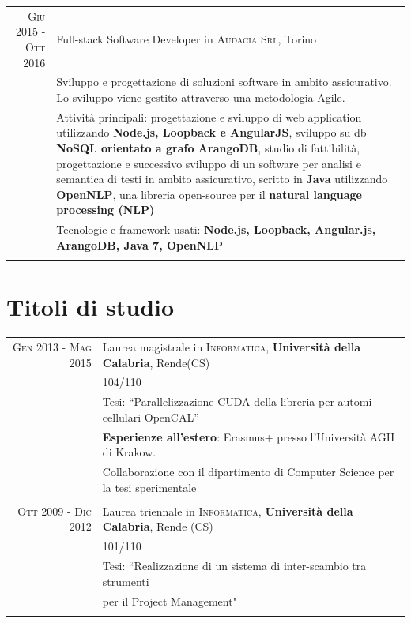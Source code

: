 \documentclass[a4paper,10pt]{article} %
\begin{document}
\begin{tabular}{r|p{11cm}}

\textsc{Giu 2015 - Ott 2016} & Full-stack Software Developer in \textsc{Audacia Srl}, Torino \emph{}\\
& \footnotesize{Sviluppo e progettazione di soluzioni software in ambito assicurativo. Lo sviluppo viene gestito attraverso una metodologia Agile. }\\
& \footnotesize{Attività principali: progettazione e sviluppo di web application utilizzando \textbf{Node.js, Loopback e AngularJS}, sviluppo su db \textbf{NoSQL orientato a grafo ArangoDB}, studio di fattibilità, progettazione e successivo sviluppo di un software per analisi e semantica di testi in ambito assicurativo, scritto in \textbf{Java} utilizzando \textbf{OpenNLP}, una libreria open-source per il \textbf{natural language processing (NLP)}}\\
& \footnotesize{Tecnologie e framework usati: \textbf{Node.js, Loopback, Angular.js, ArangoDB, Java 7, OpenNLP} }\\
\multicolumn{2}{c}{} \\

\end{tabular}


\section{Titoli di studio}

\begin{tabular}{rl}	
\textsc{Gen 2013 - Mag 2015} & Laurea magistrale in \textsc{Informatica}, \textbf{Università della Calabria}, Rende(CS)\\
& 104/110\\
& Tesi: ``Parallelizzazione CUDA della libreria per automi cellulari OpenCAL''\\
&\textbf{ Esperienze all'estero}: Erasmus+ presso l'Università AGH di Krakow.\\
& Collaborazione con il dipartimento di Computer Science per la tesi sperimentale\\
&\\


\textsc{Ott 2009 - Dic 2012} & Laurea triennale in \textsc{}\textsc{Informatica}, \normalsize\textbf{Università della Calabria}, Rende (CS)\\
 &101/110\\
& Tesi: ``Realizzazione di un sistema di inter-scambio tra strumenti \\
&per il Project
Management" \\
&\\
\end{tabular}
\end{document}
